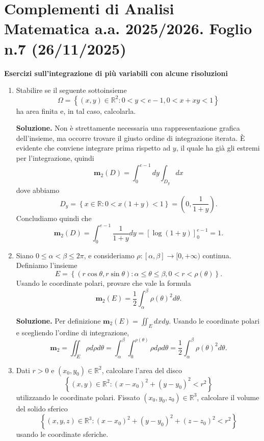 \section*{Complementi di Analisi Matematica a.a. 2025/2026. Foglio n.7 (26/11/2025)}

\textbf{Esercizi sull'integrazione di più variabili con alcune risoluzioni}

\begin{enumerate}
	\item Stabilire se il seguente sottoinsieme
	\[
	\Omega = \left\{(x,y) \in \mathbb{R}^2 : 0 < y < e - 1, 0 < x + xy < 1\right\}
	\]
	ha area finita e, in tal caso, calcolarla.
	
	\textbf{Soluzione.}
		Non è strettamente necessaria una rappresentazione grafica dell'insieme, ma occorre trovare il giusto ordine di integrazione iterata. È evidente che conviene integrare prima rispetto ad $y$, il quale ha già gli estremi per l'integrazione, quindi
		\[
		\mathbf{m}_2(D) = \int_0^{e-1} dy \int_{D_y} dx
		\]
		dove abbiamo
		\[
		D_y = \left\{x \in \mathbb{R} : 0 < x(1 + y) < 1\right\} = \left(0, \frac{1}{1 + y}\right).
		\]
		Concludiamo quindi che
		\[
		\mathbf{m}_2(D) = \int_0^{e-1} \frac{1}{1 + y} dy = \left[\log(1 + y)\right]_0^{e-1} = 1.
		\]
	
	
	\item Siano $0 \leq \alpha < \beta \leq 2\pi$, e consideriamo $\rho: [\alpha, \beta] \to [0, +\infty)$ continua. Definiamo l'insieme
	\[
	E = \left\{(r \cos \theta, r \sin \theta) : \alpha \leq \theta \leq \beta, 0 < r < \rho(\theta)\right\}.
	\]
	Usando le coordinate polari, provare che vale la formula
	\[
	\mathbf{m}_2(E) = \frac{1}{2} \int_{\alpha}^{\beta} \rho(\theta)^2 d\theta.
	\]
	
	\textbf{Soluzione.}
		Per definizione $\mathbf{m}_2(E) = \iint_E dx dy$. Usando le coordinate polari e scegliendo l'ordine di integrazione,
		\[
		\mathbf{m}_2 = \iint_E \rho d\rho d\theta = \int_{\alpha}^{\beta} \int_0^{\rho(\theta)} \rho d\rho d\theta = \frac{1}{2} \int_{\alpha}^{\beta} \rho(\theta)^2 d\theta.
		\]
	
	
	\item Dati $r > 0$ e $(x_0, y_0) \in \mathbb{R}^2$, calcolare l'area del disco
	\[
	\left\{(x,y) \in \mathbb{R}^2 : (x - x_0)^2 + (y - y_0)^2 < r^2\right\}
	\]
	utilizzando le coordinate polari. Fissato $(x_0, y_0, z_0) \in \mathbb{R}^3$, calcolare il volume del solido sferico
	\[
	\left\{(x,y,z) \in \mathbb{R}^3 : (x - x_0)^2 + (y - y_0)^2 + (z - z_0)^2 < r^2\right\}
	\]
	usando le coordinate sferiche.
	

\end{enumerate}
